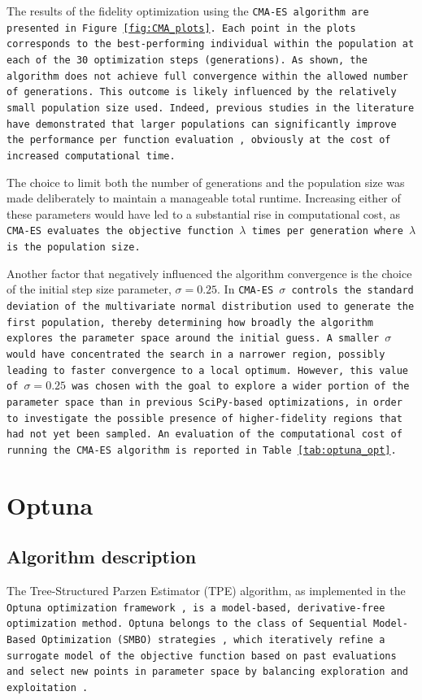 The results of the fidelity optimization using the \tt{CMA-ES} algorithm are presented in Figure \ref{fig:CMA_plots}. 
Each point in the plots corresponds to the best-performing individual within the population at each of the 30 optimization steps (generations). 
As shown, the algorithm does not achieve full convergence within the allowed number of generations. 
This outcome is likely influenced by the relatively small population size used. 
Indeed, previous studies in the literature have demonstrated that larger populations can significantly improve the performance per function evaluation \cite{hansen2004evaluating}, obviously at the cost of increased computational time.

The choice to limit both the number of generations and the population size was made deliberately to maintain a manageable total runtime. 
Increasing either of these parameters would have led to a substantial rise in computational cost, as \tt{CMA-ES} evaluates the objective function $\lambda$ times per generation where $\lambda$ is the population size.

Another factor that negatively influenced the algorithm convergence is the choice of the initial step size parameter, $\sigma = 0.25$. 
In \tt{CMA-ES} $\sigma$ controls the standard deviation of the multivariate normal distribution used to generate the first population, thereby determining how broadly the algorithm explores the parameter space around the initial guess. 
A smaller $\sigma$ would have concentrated the search in a narrower region, possibly leading to faster convergence to a local optimum. 
However, this value of $\sigma = 0.25$ was chosen with the goal to explore a wider portion of the parameter space than in previous \texttt{SciPy}-based optimizations, in order to investigate the possible presence of higher-fidelity regions that had not yet been sampled.
An evaluation of the computational cost of running the \tt{CMA-ES} algorithm is reported in Table \ref{tab:optuna_opt}.

\section{Optuna}

\subsection{Algorithm description}

The Tree-Structured Parzen Estimator (TPE) algorithm, as implemented in the \tt{Optuna} optimization framework \cite{optuna_2019}, is a model-based, derivative-free optimization method. 
\tt{Optuna} belongs to the class of Sequential Model-Based Optimization (SMBO) strategies \cite{SMBO_proceedings}, which iteratively refine a surrogate model of the objective function based on past evaluations and select new points in parameter space by balancing exploration and exploitation \cite{BayesianOptimizationReview}.

